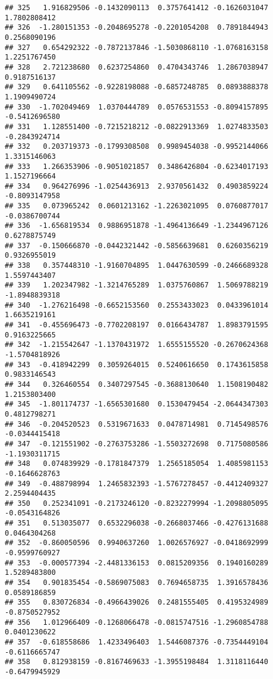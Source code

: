 \documentclass[
]{article}
\begin{document}
\begin{verbatim}
## 325   1.916829506 -0.1432090113  0.3757641412 -0.1626031047  1.7802808412
## 326  -1.280151353 -0.2048695278 -0.2201054208  0.7891844943  0.2568090196
## 327   0.654292322 -0.7872137846 -1.5030868110 -1.0768163158  1.2251767450
## 328   2.721238680  0.6237254860  0.4704343746  1.2867038947  0.9187516137
## 329   0.641105562 -0.9228198088 -0.6857248785  0.0893888378  1.1909490724
## 330  -1.702049469  1.0370444789  0.0576531553 -0.8094157895 -0.5412696580
## 331   1.128551400 -0.7215218212 -0.0822913369  1.0274833503 -0.2843924714
## 332   0.203719373 -0.1799308508  0.9989454038 -0.9952144066  1.3315146063
## 333   1.266353906 -0.9051021857  0.3486426804 -0.6234017193  1.1527196664
## 334   0.964276996 -1.0254436913  2.9370561432  0.4903859224 -0.8093147958
## 335   0.073965242  0.0601213162 -1.2263021095  0.0760877017 -0.0386700744
## 336  -1.656819534  0.9886951878 -1.4964136649 -1.2344967126  0.6278875749
## 337  -0.150666870 -0.0442321442 -0.5856639681  0.6260356219  0.9326955019
## 338   0.357448310 -1.9160704895  1.0447630599 -0.2466689328  1.5597443407
## 339   1.202347982 -1.3214765289  1.0375760867  1.5069788219 -1.8948839318
## 340  -1.276216498 -0.6652153560  0.2553433023  0.0433961014  1.6635219161
## 341  -0.455696473 -0.7702208197  0.0166434787  1.8983791595  0.9163225665
## 342  -1.215542647 -1.1370431972  1.6555155520 -0.2670624368 -1.5704818926
## 343  -0.418942299  0.3059264015  0.5240616650  0.1743615858  0.9833146543
## 344   0.326460554  0.3407297545 -0.3688130640  1.1508190482  1.2153803400
## 345  -1.801174737 -1.6565301680  0.1530479454 -2.0644347303  0.4812798271
## 346  -0.204520523  0.5319671633  0.0478714981  0.7145498576 -0.0344415418
## 347  -0.121551902 -0.2763753286 -1.5503272698  0.7175080586 -1.1930311715
## 348   0.074839929 -0.1781847379  1.2565185054  1.4085981153 -0.1646628763
## 349  -0.488798994  1.2465832393 -1.5767278457 -0.4412409327  2.2594404435
## 350   0.252341091 -0.2173246120 -0.8232279994 -1.2098805095 -0.0543164826
## 351   0.513035077  0.6532296038 -0.2668037466 -0.4276131688  0.0464304268
## 352  -0.860050596  0.9940637260  1.0026576927 -0.0418692999 -0.9599760927
## 353  -0.000577394 -2.4481336153  0.0815209356  0.1940160289  1.5289483800
## 354   0.901835454 -0.5869075083  0.7694658735  1.3916578436  0.0589186859
## 355   0.830726834 -0.4966439026  0.2481555405  0.4195324989 -0.8750527952
## 356   1.012966409 -0.1268066478 -0.0815747516 -1.2960854788  0.0401230622
## 357  -0.618558686  1.4233496403  1.5446087376 -0.7354449104 -0.6116665747
## 358   0.812938159 -0.8167469633 -1.3955198484  1.3118116440 -0.6479945929

\end{verbatim}
\end{document}
